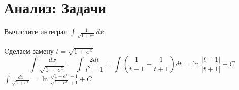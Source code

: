 \section{Анализ: Задачи}
\begin{problem}
	Вычислите интеграл $\displaystyle \int \frac{1}{\sqrt{1+e^{x}}} d x$
\end{problem}
\begin{solution}
	Cделаем замену $t=\sqrt{1+e^{x}}$
	$$ \displaystyle
	\int \frac{d x}{\sqrt{1+e^{x}}}=\int \frac{2 d t}{t^{2}-1}=\int\left(\frac{1}{t-1}-\frac{1}{t+1}\right) d t=\ln \frac{|t-1|}{|t+1|}+C$$
	$\displaystyle
	\int \frac{d x}{\sqrt{1+e^{x}}}=\ln \frac{\sqrt{1+e^{x}}-1}{\sqrt{1+e^{x}}+1}+C$
\end{solution}	